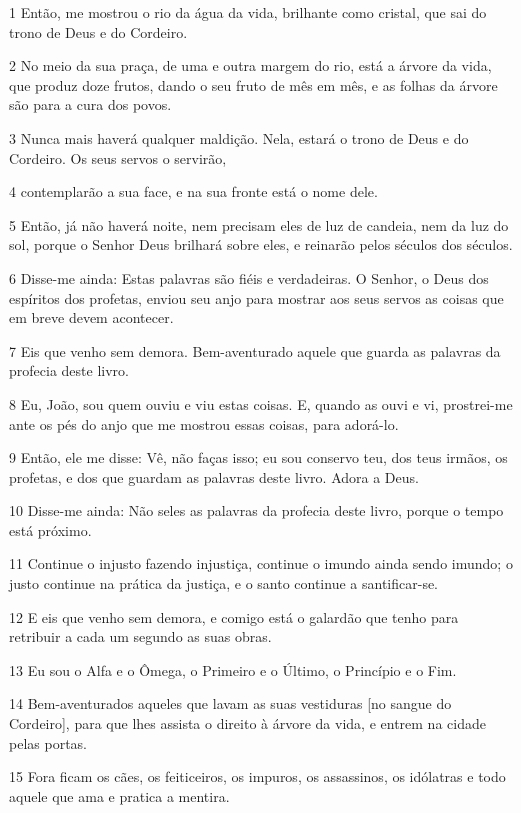 \par 1 Então, me mostrou o rio da água da vida, brilhante como cristal, que sai do trono de Deus e do Cordeiro.
\par 2 No meio da sua praça, de uma e outra margem do rio, está a árvore da vida, que produz doze frutos, dando o seu fruto de mês em mês, e as folhas da árvore são para a cura dos povos.
\par 3 Nunca mais haverá qualquer maldição. Nela, estará o trono de Deus e do Cordeiro. Os seus servos o servirão,
\par 4 contemplarão a sua face, e na sua fronte está o nome dele.
\par 5 Então, já não haverá noite, nem precisam eles de luz de candeia, nem da luz do sol, porque o Senhor Deus brilhará sobre eles, e reinarão pelos séculos dos séculos.
\par 6 Disse-me ainda: Estas palavras são fiéis e verdadeiras. O Senhor, o Deus dos espíritos dos profetas, enviou seu anjo para mostrar aos seus servos as coisas que em breve devem acontecer.
\par 7 Eis que venho sem demora. Bem-aventurado aquele que guarda as palavras da profecia deste livro.
\par 8 Eu, João, sou quem ouviu e viu estas coisas. E, quando as ouvi e vi, prostrei-me ante os pés do anjo que me mostrou essas coisas, para adorá-lo.
\par 9 Então, ele me disse: Vê, não faças isso; eu sou conservo teu, dos teus irmãos, os profetas, e dos que guardam as palavras deste livro. Adora a Deus.
\par 10 Disse-me ainda: Não seles as palavras da profecia deste livro, porque o tempo está próximo.
\par 11 Continue o injusto fazendo injustiça, continue o imundo ainda sendo imundo; o justo continue na prática da justiça, e o santo continue a santificar-se.
\par 12 E eis que venho sem demora, e comigo está o galardão que tenho para retribuir a cada um segundo as suas obras.
\par 13 Eu sou o Alfa e o Ômega, o Primeiro e o Último, o Princípio e o Fim.
\par 14 Bem-aventurados aqueles que lavam as suas vestiduras [no sangue do Cordeiro], para que lhes assista o direito à árvore da vida, e entrem na cidade pelas portas.
\par 15 Fora ficam os cães, os feiticeiros, os impuros, os assassinos, os idólatras e todo aquele que ama e pratica a mentira.
